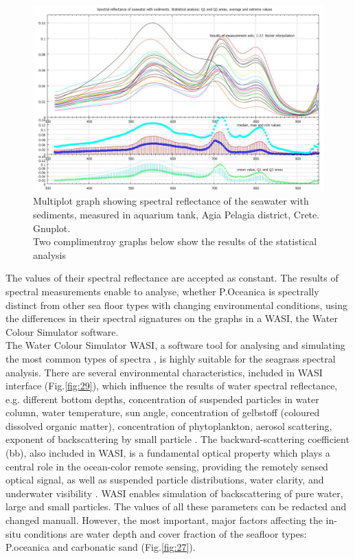 \documentclass[10pt, a4paper]{article}
\begin{document}
\begin{figure}[H]
\centering
\includegraphics[scale=0.30]{GNU-18.jpg}
\caption{Multiplot graph showing spectral reflectance of the seawater with sediments, measured in aquarium tank, Agia Pelagia district, Crete. Gnuplot. \\Two complimentray graphs below show the results of the statistical analysis}
\label{fig:26}
\end{figure}

The values of their spectral reflectance are accepted as constant. The results of
spectral measurements enable to analyse, whether P.Oceanica is spectrally distinct from other sea
floor types with changing environmental conditions, using the differences in their spectral signatures
on the graphs in a WASI, the Water Colour Simulator software. \\The Water Colour Simulator WASI, a
software tool for analysing and simulating the most common types of spectra \cite{Gege05}\label{Gege05}, is highly
suitable for the seagrass spectral analysis.
There are several environmental characteristics, included in WASI interface (Fig.\ref{fig:29}), which influence the
results of water spectral reflectance, e.g. different bottom depths, concentration of suspended particles
in water column, water temperature, sun angle, concentration of gelbstoff (coloured dissolved organic
matter), concentration of phytoplankton, aerosol scattering, exponent of backscattering by small
particle \cite{Gege04}\label{Gege04}. The backward-scattering coefficient (bb), also included in WASI, is a
fundamental optical property which plays a central role in the ocean-color remote sensing, providing
the remotely sensed optical signal, as well as suspended particle distributions, water clarity, and
underwater visibility \cite{Maffione97}\label{Maffione97}. WASI enables simulation of backscattering of pure
water, large and small particles. The values of all these parameters can be redacted and changed
manuall. However, the most important, major factors affecting the in-situ conditions are water depth
and cover fraction of the seafloor types: P.oceanica and carbonatic sand (Fig.\ref{fig:27}).
\end{document}
